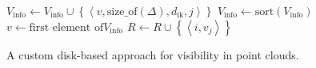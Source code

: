 \begin{algorithm}[tb]
{{{{          
        }
        $ V_\text{info} \gets V_\text{info} \cup \left\lbrace \left\langle v, \text{size\_of}(\Delta), d_\text{ik}, j \right\rangle \right\rbrace $\;
      }
      \;
      $V_\text{info} \gets \text{sort}(V_\text{info})$ 
      $v \gets \text{first element of} V_\text{info}$\;
      $R \gets R \cup \left\lbrace \left\langle i, v_j \right\rangle \right\rbrace $\;
    }

    \;
    \;
  }
  \caption{A custom disk-based approach for visibility in point clouds.\label{alg:disk-based}}
\end{algorithm}



